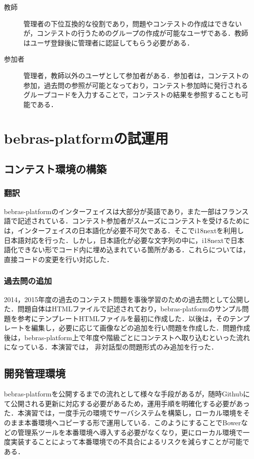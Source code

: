 \documentclass[a4paper]{jarticle}
\begin{document}
\begin{multicols}{2}
\begin{description}
\item[教師] 管理者の下位互換的な役割であり，問題やコンテストの作成はできないが，コンテストの行うためのグループの作成が可能なユーザである．教師はユーザ登録後に管理者に認証してもらう必要がある．
\end{description}

\begin{description}
\item[参加者] 管理者，教師以外のユーザとして参加者がある．参加者は，コンテストの参加，過去問の参照が可能となっており，コンテスト参加時に発行されるグループコードを入力することで，コンテストの結果を参照することも可能である．
\end{description}




\section{bebras-platformの試運用}
\subsection{コンテスト環境の構築}
\subsubsection{翻訳}
bebras-platformのインターフェイスは大部分が英語であり，また一部はフランス語で記述されている．コンテスト参加者がスムーズにコンテストを受けるためには，インターフェイスの日本語化が必要不可欠である．そこでi18nextを利用し日本語対応を行った．しかし，日本語化が必要な文字列の中に，i18nextで日本語化できない形でコード内に埋め込まれている箇所がある．これらについては，直接コードの変更を行い対応した．

\subsubsection{過去問の追加}
2014，2015年度の過去のコンテスト問題を事後学習のための過去問として公開した．問題自体はHTMLファイルで記述されており，bebras-platformのサンプル問題を参考にテンプレートHTMLファイルを最初に作成した．以後は，そのテンプレートを編集し，必要に応じて画像などの追加を行い問題を作成した．問題作成後は，bebras-platform上で年度や階級ごとにコンテストへ取り込むといった流れになっている．本演習では，
非対話型の問題形式のみ追加を行った．

\subsection{開発管理環境}
bebras-platformを公開するまでの流れとして様々な手段があるが，随時Githubにて公開される更新に対応する必要があるため，運用手順を明確化する必要があった．本演習では，一度手元の環境でサーバシステムを構築し，ローカル環境をそのまま本番環境へコピーする形で運用している．このようにすることでBowerなどの管理系ツールを本番環境へ導入する必要がなくなり，更にローカル環境で一度実装することによって本番環境での不具合によるリスクを減らすことが可能である．


\end{multicols}
\end{document}
